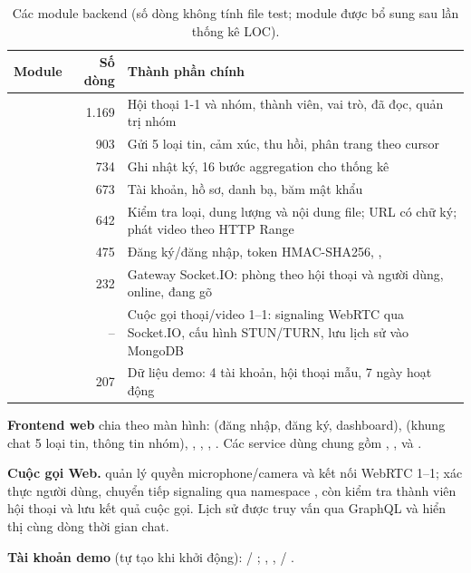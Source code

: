 \documentclass[11pt, a4paper]{article}
\begin{document}
\begin{table}[H]
  \centering
  \small
  \caption{Các module backend (số dòng không tính file test; module  được bổ sung sau lần thống kê LOC).}
  \label{tab:modules}
  \begin{tabularx}{\linewidth}{lrY}
    \toprule
    \textbf{Module} & \textbf{Số dòng} & \textbf{Thành phần chính} \\
    \midrule
     & 1.169 & Hội thoại 1-1 và nhóm, thành viên, vai trò, đã đọc, quản trị nhóm \\
     & 903 & Gửi 5 loại tin, cảm xúc, thu hồi, phân trang theo cursor \\
     & 734 & Ghi nhật ký, 16 bước aggregation cho thống kê \\
     & 673 & Tài khoản, hồ sơ, danh bạ, băm mật khẩu  \\
     & 642 & Kiểm tra loại, dung lượng và nội dung file; URL có chữ ký; phát video theo HTTP Range \\
     & 475 & Đăng ký/đăng nhập, token HMAC-SHA256, ,  \\
     & 232 & Gateway Socket.IO: phòng theo hội thoại và người dùng, online, đang gõ \\
     & -- & Cuộc gọi thoại/video 1--1: signaling WebRTC qua Socket.IO, cấu hình STUN/TURN, lưu lịch sử vào MongoDB \\
     & 207 & Dữ liệu demo: 4 tài khoản, hội thoại mẫu, 7 ngày hoạt động \\
    \bottomrule
  \end{tabularx}
\end{table}

\textbf{Frontend web} chia theo màn hình:  (đăng nhập, đăng ký, dashboard),  (khung chat 5 loại tin, thông tin nhóm), , , , . Các service dùng chung gồm , ,  và .

\textbf{Cuộc gọi Web.}  quản lý quyền microphone/camera và kết nối WebRTC 1--1;  xác thực người dùng, chuyển tiếp signaling qua namespace , còn  kiểm tra thành viên hội thoại và lưu kết quả cuộc gọi. Lịch sử được truy vấn qua GraphQL và hiển thị cùng dòng thời gian chat.

\textbf{Tài khoản demo} (tự tạo khi khởi động):  / ; , ,  / .
\end{document}
